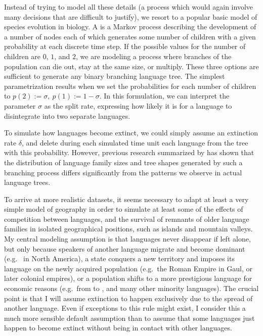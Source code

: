 Instead of trying to model all these details (a process which would again involve many decisions that are difficult to justify), we resort to a popular basic model of species evolution in biology. A  is a Markov process describing the development of a number of nodes each of which generates some number of children with a given probability at each discrete time step. If the possible values for the number of children are $0$, $1$, and $2$, we are modeling a process where branches of the population can die out, stay at the same size, or multiply. These three options are sufficient to generate any binary branching language tree. The simplest parametrization results when we set the probabilities for each number of children to $p(2) := \sigma,\ p(1) := 1 - \sigma$. In this formulation, we can interpret the parameter $\sigma$ as the split rate, expressing how likely it is for a language to disintegrate into two separate languages.

To simulate how languages become extinct, we could simply assume an extinction rate $\delta$, and delete during each simulated time unit each language from the tree with this probability. However, previous research summarized by \cite{holman2005} has shown that the distribution of language family sizes and tree shapes generated by such a branching process differs significantly from the patterns we observe in actual language trees.

To arrive at more realistic datasets, it seems necessary to adapt at least a very simple model of geography in order to simulate at least some of the effects of competition between languages, and the survival of remnants of older language families in isolated geographical positions, such as islands and mountain valleys. My central modeling assumption is that languages never disappear if left alone, but only because speakers of another language migrate and become dominant (e.g.\  in North America), a state conquers a new territory and imposes its language on the newly acquired population (e.g.\ the Roman Empire in Gaul, or later colonial empires), or a population shifts to a more prestigious language for economic reasons (e.g.\ from  to , and many other minority languages). The crucial point is that I will assume extinction to happen exclusively due to the spread of another language. Even if exceptions to this rule might exist, I consider this a much more sensible 
default assumption than to assume that some languages just happen to become extinct without being in contact with other languages.

